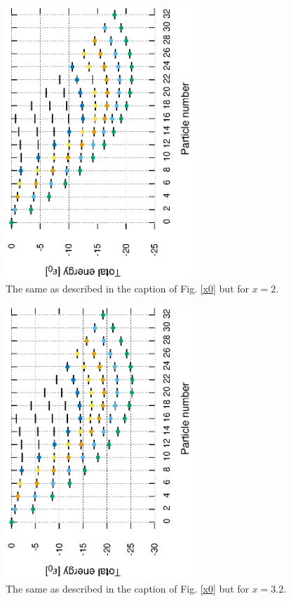 \documentclass[11pt]{book} %
\begin{document}
\begin{figure}[htbp]
 \begin{center}
  \includegraphics[width=70mm,angle=-90]{images/spectra_x2.eps}
 \end{center}
 \caption{The same as described in the caption of Fig. \ref{x0} but for $x=2$.
	}
 \label{x2}
\end{figure}

\begin{figure}[htbp]
 \begin{center}
  \includegraphics[width=70mm,angle=-90]{images/spectra_x3p2.eps}
 \end{center}
 \caption{The same as described in the caption of Fig. \ref{x0} but for $x=3.2$.
	}
 \label{x3p2}
\end{figure}
\end{document}
